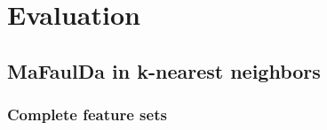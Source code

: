 \chapter{Evaluation} \label{chapter:evaluation} 

\section{MaFaulDa in k-nearest neighbors}

\subsection{Complete feature sets}

